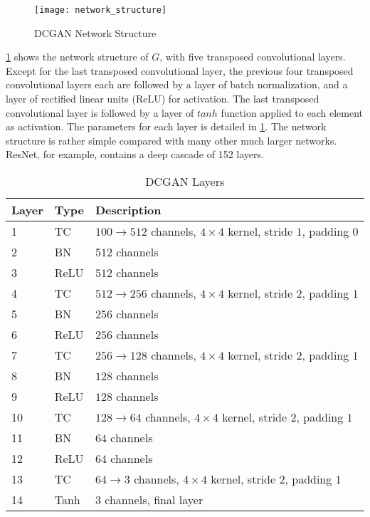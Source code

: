 \begin{figure}[h]
  \centering
  \texttt{[image: network\_structure]}
  \caption{DCGAN Network Structure}
  \label{fig:network_structure}
\end{figure}

\ref{fig:network_structure} shows the network structure of $G$, with five transposed convolutional layers.
Except for the last transposed convolutional layer, the previous four transposed convolutional layers each
are followed by a layer of batch normalization, and a layer of rectified linear units (ReLU) for
activation. The last transposed convolutional layer is followed by a layer of $tanh$ function applied to
each element as activation. The parameters for each layer is detailed in \ref{table:network_layers}.
The network structure is rather simple compared with many other much larger networks. ResNet, for example,
contains a deep cascade of 152 layers.

\begin{table}[h]
  \centering
  \caption{DCGAN Layers}
  \begin{tabular}{l | l | l }
    \toprule
    Layer & Type & Description \\
    \midrule
    1 & TC & $100 \rightarrow 512$ channels, $4 \times 4$ kernel, stride $1$, padding $0$ \\
    2 & BN & $512$ channels\\
    3 & ReLU & $512$ channels \\
    4 & TC & $512 \rightarrow 256$ channels, $4 \times 4$ kernel, stride $2$, padding $1$ \\
    5 & BN & $256$ channels \\
    6 & ReLU & $256$ channels \\
    7 & TC & $256 \rightarrow 128$ channels, $4 \times 4$ kernel, stride $2$, padding $1$ \\
    8 & BN & $128$ channels \\
    9 & ReLU & $128$ channels \\
    10 & TC & $128 \rightarrow 64$ channels, $4 \times 4$ kernel, stride $2$, padding $1$ \\
    11 & BN & $64$ channels \\
    12 & ReLU & $64$ channels \\
    13 & TC & $64 \rightarrow 3$ channels, $4 \times 4$ kernel, stride $2$, padding $1$ \\
    14 & Tanh & 3 channels, final layer \\
    \bottomrule
  \end{tabular}
  \label{table:network_layers}
\end{table}

\clearpage %

